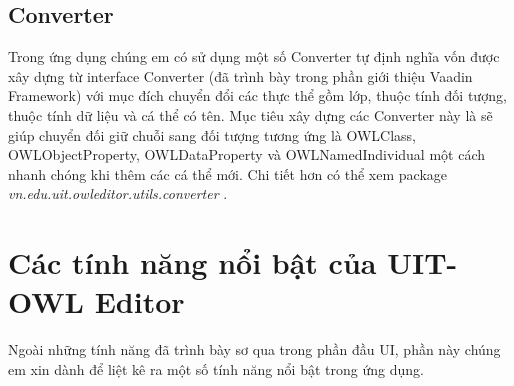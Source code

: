 \subsection{Converter}
Trong ứng dụng chúng em có sử dụng một số Converter tự định nghĩa vốn được xây dựng từ interface Converter (đã trình bày trong phần giới thiệu Vaadin Framework) với mục đích chuyển đổi các thực thể gồm lớp, thuộc tính đối tượng, thuộc tính dữ liệu và cá thể có tên. Mục tiêu xây dựng các Converter này là sẽ giúp chuyển đối giữ chuỗi sang đối tượng tương ứng là OWLClass, OWLObjectProperty, OWLDataProperty và OWLNamedIndividual một cách nhanh chóng khi thêm các cá thể mới. Chi tiết hơn có thể xem package \textit{vn.edu.uit.owleditor.utils.converter} \cite{owleditorSrc}.

\section{Các tính năng nổi bật của UIT-OWL Editor}
Ngoài những tính năng đã trình bày sơ qua trong phần đầu UI, phần này chúng em xin dành để liệt kê ra một số tính năng nổi bật trong ứng dụng.

